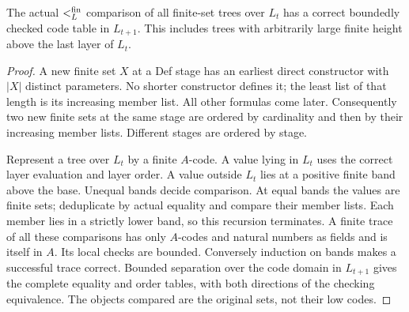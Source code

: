 

\begin{lemma}\label{lem:finite-order}
The actual $<_L^{\rm fin}$ comparison of all finite-set trees over
$L_t$ has a correct boundedly checked code table in $L_{t+1}$. This
includes trees with arbitrarily large finite height above the last
layer of $L_t$.
\end{lemma}
\begin{proof}
A new finite set $X$ at a Def stage has an earliest direct constructor
with $|X|$ distinct parameters. No shorter constructor defines it;
the least list of that length is its increasing member list. All
other formulas come later. Consequently two new finite sets at the
same stage are ordered by cardinality and then by their increasing
member lists. Different stages are ordered by stage.

Represent a tree over $L_t$ by a finite $A$-code. A value lying in
$L_t$ uses the correct layer evaluation and layer order. A value
outside $L_t$ lies at a positive finite band above the base. Unequal
bands decide comparison. At equal bands the values are finite sets;
deduplicate by actual equality and compare their member lists. Each
member lies in a strictly lower band, so this recursion terminates.
A finite trace of all these comparisons has only $A$-codes and
natural numbers as fields and is itself in $A$. Its local checks
are bounded. Conversely induction on bands makes a successful trace
correct. Bounded separation over the code domain in $L_{t+1}$ gives
the complete equality and order tables, with both directions of the
checking equivalence. The objects compared are the original sets,
not their low codes. 
\end{proof}

